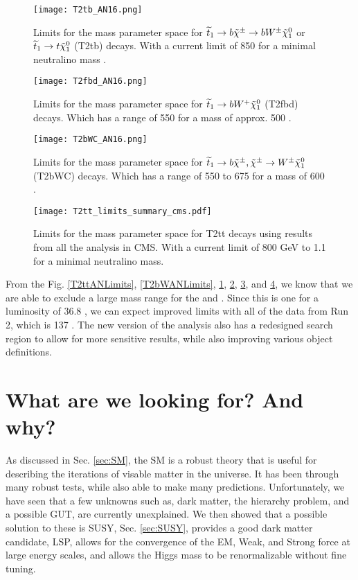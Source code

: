 \begin{figure}
\centering
	\texttt{[image: T2tb\_AN16.png]}
 	\caption[T2tb Limits]{Limits for the mass parameter space for $\widetilde{t}_1\rightarrow b \tilde{\chi}^{\pm}\rightarrow bW^\pm\tilde{\chi}^{0}_{1}$ or $\widetilde{t}_1\rightarrow t\tilde{\chi}^{0}_{1}$ (T2tb) decays. With a current limit of 850 \GeV{} for a minimal neutralino mass \cite{noauthor_search_nodate}.}
 	\label{T2tbANLimits} 
\end{figure}

\begin{figure}
\centering
	\texttt{[image: T2fbd\_AN16.png]}
 	\caption[T2fbd Limits]{Limits for the mass parameter space for $\widetilde{t}_1\rightarrow b W^+ \tilde{\chi}^{0}_{1}$ (T2fbd) decays. Which has a range of 550 \GeV{} for a \neutralino{} mass of approx. 500 \GeV{} \cite{noauthor_search_nodate}.}
 	\label{T2fbdANLimits} 
\end{figure}

\begin{figure}
\centering
	\texttt{[image: T2bWC\_AN16.png]}
 	\caption[T2bWC Limits]{Limits for the mass parameter space for $\widetilde{t}_1\rightarrow b\tilde{\chi}^{\pm}, \tilde{\chi}^{\pm}\rightarrow W ^\pm\tilde{\chi}^{0}_{1}$ (T2bWC) decays. Which has a range of 550 to 675 \GeV{} for a \neutralino{} mass of 600 \GeV{} \cite{noauthor_search_nodate}.}
 	\label{T2bWCANLimits} 
\end{figure}

\begin{figure}
\centering
	\texttt{[image: T2tt\_limits\_summary\_cms.pdf]}
 	\caption[T2tt Limits for all decay modes]{Limits for the mass parameter space for T2tt decays using results from all the analysis in CMS. With a current limit of 800 GeV to 1.1 \TeV{} for a minimal neutralino mass.}
 	\label{T2ttCMSAll} 
\end{figure}

From the Fig. \ref{T2ttANLimits}, \ref{T2bWANLimits}, \ref{T2tbANLimits}, \ref{T2fbdANLimits}, \ref{T2bWCANLimits}, and \ref{T2ttCMSAll}, we know that we are able to exclude a large mass range for the \st{} and \neutralino{}. Since this is one for a luminosity of 36.8 \fb, we can expect improved limits with all of the data from Run 2, which is 137 \fb. The new version of the analysis also has a redesigned search region to allow for more sensitive results, while also improving various object definitions.

\section{What are we looking for? And why?}
As discussed in Sec. \ref{sec:SM}, the SM is a robust theory that is useful for describing the iterations of visable matter in the universe. It has been through many robust tests, while also able to make many predictions. Unfortunately, we have seen that a few unknowns such as, dark matter, the hierarchy problem, and a possible GUT, are currently unexplained. We then showed that a possible solution to these is SUSY, Sec. \ref{sec:SUSY}, provides a good dark matter candidate, LSP, allows for the convergence of the EM, Weak, and Strong force at large energy scales, and allows the Higgs mass to be renormalizable without fine tuning. 

